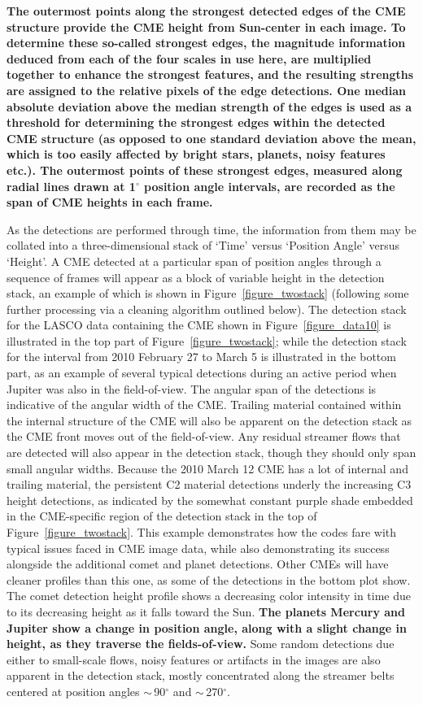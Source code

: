 \documentclass[preprint2]{aastex}
\begin{document}
{\bf The outermost points along the strongest detected edges of the CME structure provide the CME height from Sun-center in each image. To determine these so-called strongest edges, the magnitude information deduced from each of the four scales in use here, are multiplied together to enhance the strongest features, and the resulting strengths are assigned to the relative pixels of the edge detections. One median absolute deviation above the median strength of the edges is used as a threshold for determining the strongest edges within the detected CME structure (as opposed to one standard deviation above the mean, which is too easily affected by bright stars, planets, noisy features etc.). The outermost points of these strongest edges, measured along radial lines drawn at 1$^{\circ}$ position angle intervals, are recorded as the span of CME heights in each frame.

As the detections are performed through time, the information from them may be collated into a three-dimensional stack of `Time' versus `Position Angle' versus `Height'. A CME detected at a particular span of position angles through a sequence of frames will appear as a block of variable height in the detection stack, an example of which is shown in Figure~\ref{figure_twostack} (following some further processing via a cleaning algorithm outlined below). The detection stack for the LASCO data containing the CME shown in Figure~\ref{figure_data10} is illustrated in the top part of Figure~\ref{figure_twostack}; while the detection stack for the interval from 2010 February 27 to March 5 is illustrated in the bottom part, as an example of several typical detections during an active period when Jupiter was also in the field-of-view. The angular span of the detections is indicative of the angular width of the CME. Trailing material contained within the internal structure of the CME will also be apparent on the detection stack as the CME front moves out of the field-of-view. Any residual streamer flows that are detected will also appear in the detection stack, though they should only span small angular widths. Because the 2010 March 12 CME has a lot of internal and trailing material, the persistent C2 material detections underly the increasing C3 height detections, as indicated by the somewhat constant purple shade embedded in the CME-specific region of the detection stack in the top of Figure~\ref{figure_twostack}. This example demonstrates how the codes fare with typical issues faced in CME image data, while also demonstrating its success alongside the additional comet and planet detections. Other CMEs will have cleaner profiles than this one, as some of the detections in the bottom plot show. The comet detection height profile shows a decreasing color intensity in time due to its decreasing height as it falls toward the Sun. {\bf The planets Mercury and Jupiter show a change in position angle, along with a slight change in height, as they traverse the fields-of-view.} Some random detections due either to small-scale flows, noisy features or artifacts in the images are also apparent in the detection stack, mostly concentrated along the streamer belts centered at position angles $\sim$\,90$^{\circ}$ and $\sim$\,270$^{\circ}$.

}
\end{document}
